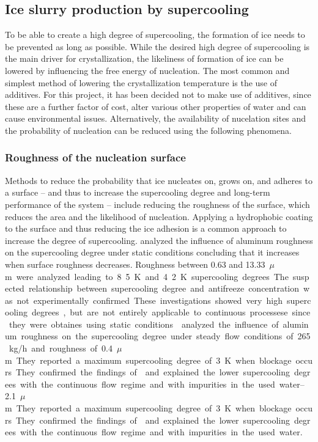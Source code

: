 \subsection{Ice slurry production by supercooling}
\label{section_lit_review_supercooling_theory}

To be able to create a high degree of supercooling, the formation of ice needs to be prevented as long as possible. While the desired high degree of supercooling is the main driver for crystallization, the likeliness of formation of ice can be lowered by influencing the free energy of nucleation. The most common and simplest method of lowering the crystallization temperature is the use of additives. For this project, it has been decided not to make use of additives, since these are a further factor of cost, alter various other properties of water and can cause environmental issues. Alternatively, the availability of nucelation sites and the probability of nucleation can be reduced using the following phenomena. 


\subsubsection{Roughness of the nucleation surface}

Methods to reduce the probability that ice nucleates on, grows on, and adheres to a surface -- and thus to increase the supercooling degree and long-term performance of the system -- include reducing the roughness of the surface, which reduces the area and the likelihood of nucleation. Applying a hydrophobic coating to the surface and thus reducing the ice adhesion is a common approach to increase the degree of supercooling.
\cite{faucheux_influence_2006} analyzed the influence of aluminum roughness on the supercooling degree under static conditions concluding that it increases when surface roughness decreases.
Roughness between 0.63 and \SI{13.33}{$\mu$m} were analyzed leading to 8.5~K and 4.2~K supercooling degrees. The suspected relationship between supercooling degree and antifreeze concentration was not experimentally confirmed.
These investigations showed very high supercooling degrees, but are not entirely applicable to continuous processese since they were obtaines using static conditions.
\cite{ernst_influence_2016} analyzed the influence of aluminum roughness on the supercooling degree under steady flow conditions of \SI{265}{kg/h} and roughness of \SIrange{0.4}{2.1}{$\mu$m}. They reported a maximum supercooling degree of \SI{3}{K} when blockage occurs. They confirmed the findings of \cite{faucheux_influence_2006} and explained the lower supercooling degrees with the continuous flow regime and with impurities in the used water.


